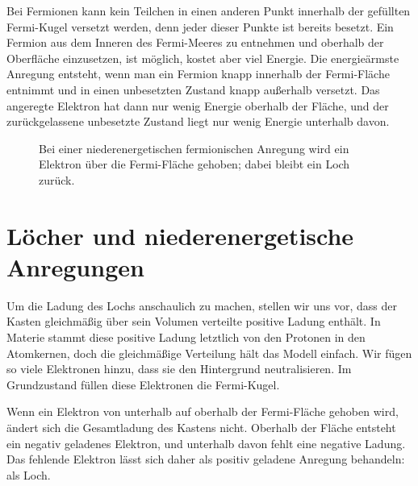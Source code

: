 Bei Fermionen kann kein Teilchen in einen anderen Punkt innerhalb der gefüllten Fermi-Kugel versetzt werden, denn jeder dieser Punkte ist bereits besetzt. Ein Fermion aus dem Inneren des Fermi-Meeres zu entnehmen und oberhalb der Oberfläche einzusetzen, ist möglich, kostet aber viel Energie. Die energieärmste Anregung entsteht, wenn man ein Fermion knapp innerhalb der Fermi-Fläche entnimmt und in einen unbesetzten Zustand knapp außerhalb versetzt. Das angeregte Elektron hat dann nur wenig Energie oberhalb der Fläche, und der zurückgelassene unbesetzte Zustand liegt nur wenig Energie unterhalb davon.

\begin{figure}
\centering
{}
\caption{Bei einer niederenergetischen fermionischen Anregung wird ein Elektron über die Fermi-Fläche gehoben; dabei bleibt ein Loch zurück.}
\end{figure}

\section{Löcher und niederenergetische Anregungen}

Um die Ladung des Lochs anschaulich zu machen, stellen wir uns vor, dass der Kasten gleichmäßig über sein Volumen verteilte positive Ladung enthält. In Materie stammt diese positive Ladung letztlich von den Protonen in den Atomkernen, doch die gleichmäßige Verteilung hält das Modell einfach. Wir fügen so viele Elektronen hinzu, dass sie den Hintergrund neutralisieren. Im Grundzustand füllen diese Elektronen die Fermi-Kugel.

Wenn ein Elektron von unterhalb auf oberhalb der Fermi-Fläche gehoben wird, ändert sich die Gesamtladung des Kastens nicht. Oberhalb der Fläche entsteht ein negativ geladenes Elektron, und unterhalb davon fehlt eine negative Ladung. Das fehlende Elektron lässt sich daher als positiv geladene Anregung behandeln: als Loch.

\begin{classroomqa}
\end{classroomqa}

